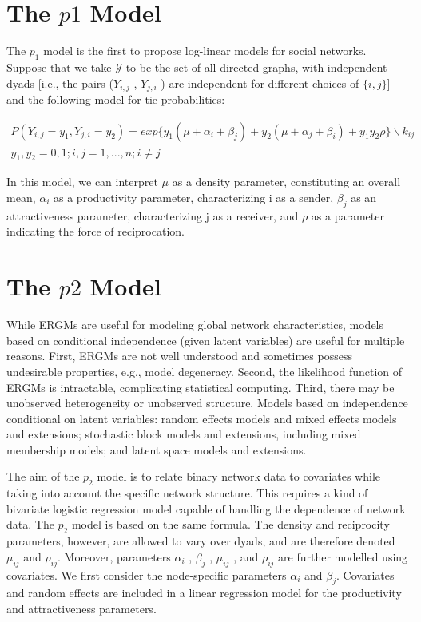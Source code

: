 \documentclass[12pt]{ociamthesis}  %
\begin{document}
	\section{The $p1$ Model}
	
	The $p_{1}$ model is the first to propose log-linear models for social
	networks. Suppose that we take $\mathcal{Y}$ to be the set of all directed graphs, with independent dyads [i.e., the pairs ($Y_{i,j}$ , $Y_{j,i}$ ) are independent for different choices of $\{i, j\}$] and the following model for tie probabilities:
	
	\begin{multline}
	P(Y_{i,j} = y_{1}, Y_{j,i} = y_{2}) = exp \{ y_{1}(\mu + \alpha_{i} + \beta_{j}) + y_{2}(\mu + \alpha_{j} + \beta_{i}) + y_{1}y_{2} \rho\} \backslash k_{ij} \\  y_{1}, y_{2} = 0,1 ; i,j = 1,...,n; i \neq j 
	\end{multline}
	
	In this model, we can interpret $\mu$ as a density parameter, constituting an overall mean, $\alpha_{i}$ as a productivity parameter, characterizing i as a sender, $\beta_{j}$ as an attractiveness parameter, characterizing j as a receiver, and $\rho$ as a parameter indicating the force of reciprocation.
	
	\section{The $p2$ Model}
	
	While ERGMs are useful for modeling global network characteristics, models based on conditional independence (given latent variables) are useful for multiple reasons. First, ERGMs are not well understood and sometimes possess undesirable properties, e.g., model degeneracy. Second, the likelihood function of ERGMs is intractable, complicating statistical computing. Third, there may be unobserved heterogeneity or unobserved structure.
	Models based on independence conditional on latent variables: random effects models and mixed effects models and extensions; stochastic block models and extensions, including mixed membership models; and latent space models and extensions.
	
	The aim of the $p_{2}$ model is to relate binary network data to covariates while taking into account the specific network structure. This requires a kind of bivariate logistic regression model capable of handling the dependence of network data.
	The $p_{2}$ model is based on the same formula. The density and reciprocity parameters, however, are allowed to vary over dyads, and are therefore denoted $\mu_{ij} $ and $\rho_{ij}$. Moreover, parameters $\alpha_{i}$ , $\beta_{j}$ , $\mu_{ij}$ , and $\rho_{ij}$ are further modelled using covariates.
	We first consider the node-specific parameters $\alpha_{i}$ and $\beta_{j}$. Covariates and random effects are included in a linear regression model for the productivity and attractiveness parameters.
	
\end{document}
